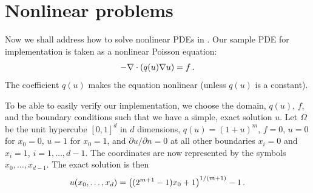 \section{Nonlinear problems}
\label{langtangen:poisson:nonlinear}
\label{nonlinear PDEs}


Now we shall address how to solve nonlinear PDEs in \fenics. Our
sample PDE for implementation is taken as a nonlinear Poisson equation:
\begin{equation}
-\nabla\cdot\left( q(u)\nabla u\right) = f\thinspace .
\end{equation}
The coefficient $q(u)$ makes the equation nonlinear (unless $q(u)$
is a constant).

To be able to easily verify our implementation, 
we choose the domain, $q(u)$, $f$, and the boundary
conditions such that we have
a simple, exact solution $u$. Let 
$\Omega$ be the unit hypercube $[0, 1]^d$
in $d$ dimensions, $q(u)=(1+u)^m$, $f=0$, $u=0$ for $x_0=0$, $u=1$
for $x_0=1$, and $\partial u/\partial n=0$ at all other boundaries
$x_i=0$ and $x_i=1$, $i=1,\ldots,d-1$. The coordinates are now represented by
the symbols $x_0,\ldots,x_{d-1}$. The exact solution is then
\begin{equation}
u(x_0,\ldots,x_d) = \left((2^{m+1}-1)x_0 + 1\right)^{1/(m+1)} - 1\thinspace .
\end{equation}

